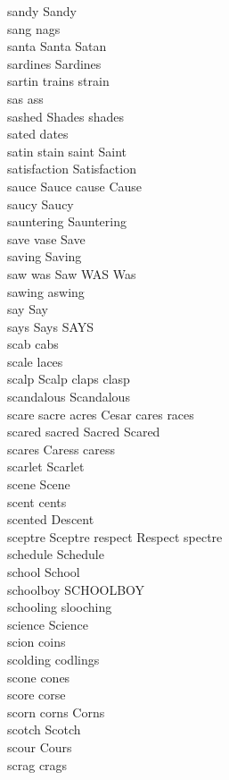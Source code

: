 sandy Sandy\\
sang nags\\
santa Santa Satan\\
sardines Sardines\\
sartin trains strain\\
sas ass\\
sashed Shades shades\\
sated dates\\
satin stain saint Saint\\
satisfaction Satisfaction\\
sauce Sauce cause Cause\\
saucy Saucy\\
sauntering Sauntering\\
save vase Save\\
saving Saving\\
saw was Saw WAS Was\\
sawing aswing\\
say Say\\
says Says SAYS\\
scab cabs\\
scale laces\\
scalp Scalp claps clasp\\
scandalous Scandalous\\
scare sacre acres Cesar cares races\\
scared sacred Sacred Scared\\
scares Caress caress\\
scarlet Scarlet\\
scene Scene\\
scent cents\\
scented Descent\\
sceptre Sceptre respect Respect spectre\\
schedule Schedule\\
school School\\
schoolboy SCHOOLBOY\\
schooling slooching\\
science Science\\
scion coins\\
scolding codlings\\
scone cones\\
score corse\\
scorn corns Corns\\
scotch Scotch\\
scour Cours\\
scrag crags\\
